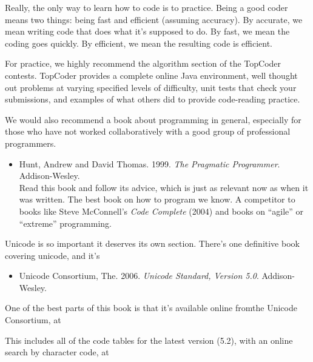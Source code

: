 
\noindent
Really, the only way to learn how to code is to practice.  Being a
good coder means two things: being fast and efficient (assuming
accuracy).  By accurate, we mean writing code that does what it's
supposed to do.  By fast, we mean the coding goes quickly.  By efficient,
we mean the resulting code is efficient.

For practice, we highly recommend the algorithm section of the
TopCoder contests.  TopCoder provides a complete online Java
environment, well thought out problems at varying specified levels of
difficulty, unit tests that check your submissions, and examples of
what others did to provide code-reading practice.
%
\begin{quote}
\end{quote}
%




\noindent
We would also recommend a book about programming in general, 
especially for those who have not worked collaboratively with
a good group of professional programmers.
%
\begin{itemize}
\item Hunt, Andrew and David Thomas.
1999.
{\it The Pragmatic Programmer}.
Addison-Wesley.
\\
{\footnotesize Read this book and follow its advice, which is just as relevant now
as when it was written.  The best book on how to program
we know.  A competitor to books like Steve McConnell's {\it Code Complete} (2004)
and books on ``agile'' or ``extreme'' programming.}
\end{itemize}



\noindent
Unicode is so important it deserves its own section.  There's one definitive
book covering unicode, and it's
%
\begin{itemize}
\item Unicode Consortium, The.  2006.
{\it Unicode Standard, Version 5.0}.
Addison-Wesley.
\end{itemize}
%
One of the best parts of this book is that it's available online fromthe
Unicode Consortium, at
%
\begin{quote}
\end{quote}
%
This includes all of the code tables for the latest version (5.2), with
an online search by character code, at
%
\begin{quote}
\end{quote}



